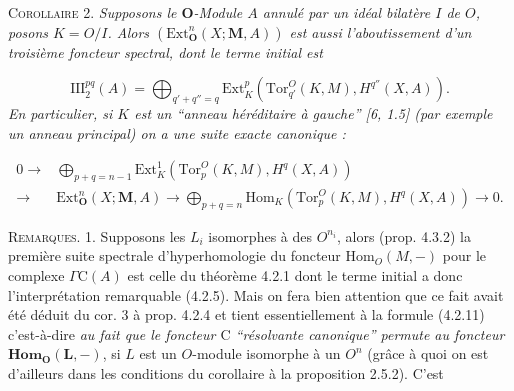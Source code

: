 \textsc{Corollaire 2.} \textit{Supposons le $\mathbf O$-Module $A$
annulé par un idéal bilatère $I$ de $O$, posons $K=O/I$. Alors
$(\mathrm{Ext}_{\mathbf O}^n(X;\mathbf M,A))$ est aussi l'aboutissement d'un
troisième foncteur spectral, dont le terme initial est}

\[
\tag{4.3.6}
\mathrm{III}_2^{pq}(A)=
\bigoplus_{q'+q''=q}
\mathrm{Ext}_K^p(\mathrm{Tor}_{q'}^O(K,M),H^{q''}(X,A)).
\]
\textit{En particulier, si $K$ est un \textup{``}anneau héréditaire à gauche\textup{''}
\textup{[6, 1.5] (}par exemple un anneau principal\textup{)} on a une suite exacte canonique :}

\[
\begin{split}
0\to{}&
\bigoplus_{p+q=n-1}
\mathrm{Ext}_K^1(\mathrm{Tor}_p^O(K,M),H^q(X,A))\\
\to{}&\mathrm{Ext}_{\mathbf O}^n(X;\mathbf M,A)
\to
\bigoplus_{p+q=n}
\mathrm{Hom}_K(\mathrm{Tor}_p^O(K,M),H^q(X,A))
\to0.
\end{split}
\]

\textsc{Remarques.} 1. Supposons les $L_i$ isomorphes à des
$O^{n_i}$, alors (prop. 4.3.2) la première suite spectrale d'hyperhomologie du
foncteur $\mathrm{Hom}_O(M,-)$ pour le complexe $\Gamma \mathrm C(A)$ est celle du
théorème 4.2.1 dont le terme initial a donc l'interprétation remarquable
(4.2.5). Mais on fera bien attention que ce fait avait été déduit du cor. 3 à
prop. 4.2.4 et tient essentiellement à la formule (4.2.11) c'est-à-dire
\textit{au fait que le foncteur $\mathrm C$ \textup{``}résolvante canonique\textup{''} permute au
foncteur} $\mathbf{Hom}_{\mathbf O}(\mathbf L,-)$, si $L$ est un $O$-module isomorphe à un $O^n$
(grâce à quoi on est d'ailleurs dans les conditions du corollaire à la
proposition 2.5.2). C'est


